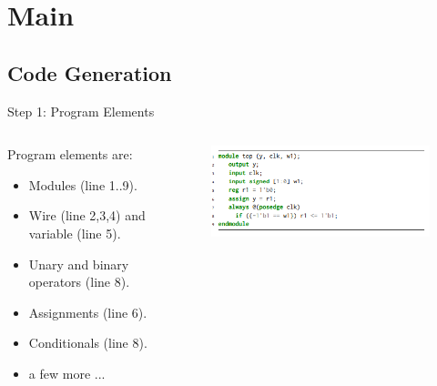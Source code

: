 \documentclass[xcolor=dvipsnames]{beamer}
\begin{document}
    \section{Main}
    
    \subsection{Code Generation}
    \begin{frame}{Step 1: Program Elements}

        \begin{columns}
            
            \begin{column}[]{0.5\textwidth}
                
                Program elements are:
                \begin{itemize}  
                    \item Modules (line 1..9). 
                    \item Wire (line 2,3,4) and variable (line 5).
                    \item Unary and binary operators (line 8). 
                    \item Assignments (line 6).
                    \item Conditionals (line 8).
                    \item a few more ...     
                \end{itemize}
            \end{column}

            \begin{column}[]{0.5\textwidth}

                \begin{figure}
                    \includegraphics{Elements_Verilog_Deterministic.PNG}
                \end{figure}

            \end{column}

        \end{columns}

    \end{frame}
\end{document}
